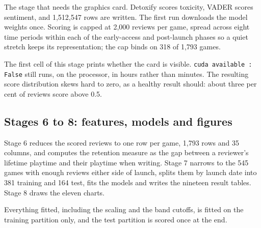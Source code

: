 The stage that needs the graphics card. Detoxify scores toxicity, VADER scores sentiment, and
1,512,547 rows are written. The first run downloads the model weights once. Scoring is capped at
2,000 reviews per game, spread across eight time periods within each of the early-access and
post-launch phases so a quiet stretch keeps its representation; the cap binds on 318 of 1,793
games.

\noindent The first cell of this stage prints whether the card is visible. \texttt{cuda available :
False} still runs, on the processor, in hours rather than minutes. The resulting score distribution
skews hard to zero, as a healthy result should: about three per cent of reviews score above 0.5.

\subsection*{Stages 6 to 8: features, models and figures}

Stage 6 reduces the scored reviews to one row per game, 1,793 rows and 35 columns, and computes the
retention measure as the gap between a reviewer's lifetime playtime and their playtime when
writing. Stage 7 narrows to the 545 games with enough reviews either side of launch, splits them by
launch date into 381 training and 164 test, fits the models and writes the nineteen result tables.
Stage 8 draws the eleven charts.

Everything fitted, including the scaling and the band cutoffs, is fitted on the training partition
only, and the test partition is scored once at the end.


